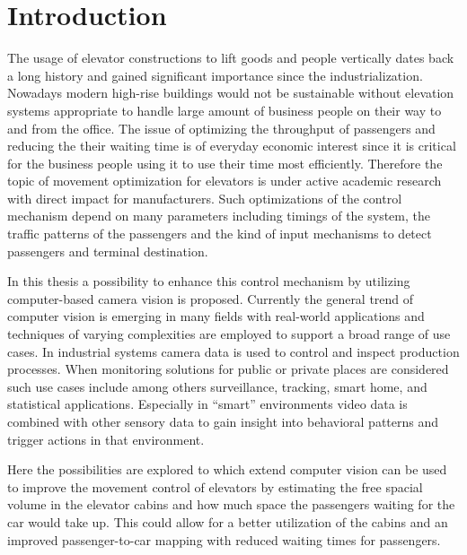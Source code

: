 \chapter{Introduction}
\label{chap:intro}


The usage of elevator constructions to lift goods and people vertically dates back a long history and gained significant importance since the industrialization.
Nowadays modern high-rise buildings would not be sustainable without elevation systems appropriate to handle large amount of business people on their way to and from the office. 
The issue of optimizing the throughput of passengers and reducing the their waiting time is of everyday economic interest since it is critical for the business people using it to use their time most efficiently. 
Therefore the topic of movement optimization for elevators is under active academic research with direct impact for manufacturers.
Such optimizations of the control mechanism depend on many parameters including timings of the system, the traffic patterns of the passengers and the kind of input mechanisms to detect passengers and terminal destination.

In this thesis a possibility to enhance this control mechanism by utilizing computer-based camera vision is proposed.
Currently the general trend of computer vision is emerging in many fields with real-world applications
and techniques of varying complexities are employed to support a broad range of use cases. 
In industrial systems camera data is used to control and inspect production processes. 
When monitoring solutions for public or private places are considered such use cases include among others surveillance, tracking,
smart home, and statistical applications.
Especially in \enquote{smart} environments video data is combined with other sensory data to gain insight into behavioral patterns and trigger actions in that environment.

Here the possibilities are explored to which extend
computer vision can be used to improve the movement control of elevators by estimating the free spacial volume in the elevator cabins and how much space the passengers waiting for the car would take up.
This could allow for a better utilization of the cabins and an improved passenger-to-car mapping with reduced waiting times for passengers.


